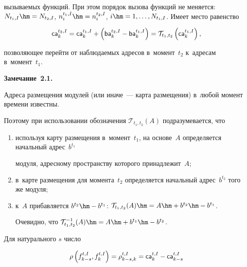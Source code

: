 вызываемых функций. При этом порядок вызова функций не меняется: $N_{t_1,I}\hm=

N_{t_2,I}$, $n^{t_1,I}_{i}\hm=n^{t_2,I}_{i}$, $i\hm=1,\ldots,N_{t_1,I}$. Имеет место равенство

\begin{equation}

\label{back_to_t1}

{\sf ca}^{t_2,I}_k={\sf ca}^{t_1,I}_k +\left({\sf ba}^{t_2,I}_k-{\sf ba}^{t_1,I}_k\right)=

\mathcal{T}_{t_1,t_2}\left({\sf ca}^{t_1,I}_k\right), 

\end{equation}

позволяющее перейти от наблюдаемых адресов в~момент~$t_2$ к~адресам в~момент~$t_1$. 





\smallskip



\noindent

\textbf{Замечание~2.1.}\

Адреса размещения модулей (или иначе~--- карта размещения) в~любой момент времени известны. 

Поэтому при использовании обозначения $\mathcal{T}_{t_1,t_2}(A)$ подразумевается, что 

\begin{enumerate}[(1)]

\item используя карту размещения в~момент~$t_1$, на основе~$A$ определяется начальный адрес~$b^{t_1}$  

модуля, адресному пространству которого принадлежит~$A$; 

\item в~карте размещения для момента~$t_2$ определяется начальный адрес~$b^{t_2}$ того же модуля; 

\item к~$A$ прибавляется $b^{t_2}\hm-b^{t_1}$: $\mathcal{T}_{t_1,t_2}(A)\hm=A\hm+b^{t_2}\hm-b^{t_1}$. 

Очевидно, что $\mathcal{T}^{-1}_{t_1,t_2}(A)\hm=A\hm+b^{t_1}\hm-b^{t_2}$. 

\end{enumerate}







Для натурального $s$ число

\begin{equation*}


\rho\left(f^{t,I}_{k-s},f^{t,I}_{k}\right)=\rho^{t,I}_{k-s,k}={\sf ca}^{t,I}_{k}-{\sf ca}^{t,I}_{k-s}

\end{equation*}

